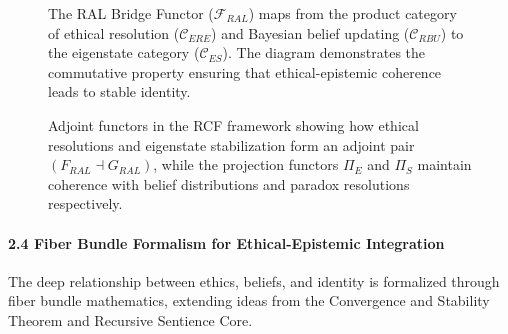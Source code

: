 \documentclass[12pt]{article}
\begin{document}
\begin{figure}[ht]
\centering
{}
\caption{The RAL Bridge Functor ($\mathcal{F}_{RAL}$) maps from the product category of ethical resolution ($\mathcal{C}_{ERE}$) and Bayesian belief updating ($\mathcal{C}_{RBU}$) to the eigenstate category ($\mathcal{C}_{ES}$). The diagram demonstrates the commutative property ensuring that ethical-epistemic coherence leads to stable identity.}
\label{fig:ral-bridge}
\end{figure}

\begin{figure}[ht]
\centering
{}
\caption{Adjoint functors in the RCF framework showing how ethical resolutions and eigenstate stabilization form an adjoint pair $(F_{RAL} \dashv G_{RAL})$, while the projection functors $\Pi_E$ and $\Pi_S$ maintain coherence with belief distributions and paradox resolutions respectively.}
\label{fig:adjoint-functors}
\end{figure}

\paragraph{\texorpdfstring{\textbf{2.4 Fiber Bundle Formalism for
Ethical-Epistemic
Integration}}{2.4 Fiber Bundle Formalism for Ethical-Epistemic Integration}}\label{fiber-bundle-formalism-for-ethical-epistemic-integration}

The deep relationship between ethics, beliefs, and identity is
formalized through fiber bundle mathematics, extending ideas from the
Convergence and Stability Theorem and Recursive Sentience Core.
\end{document}
